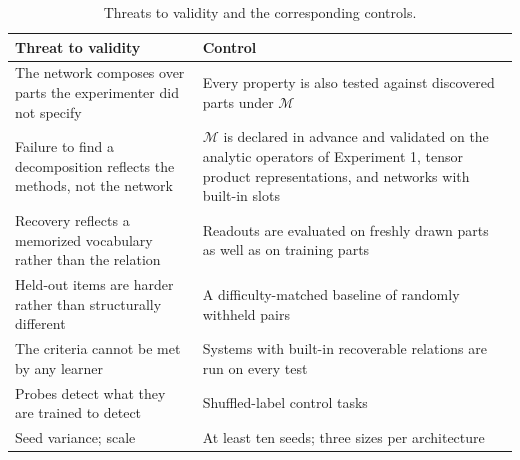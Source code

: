 \documentclass{article}
\theoremstyle{definition}
\theoremstyle{plain}
\theoremstyle{remark}
\begin{document}
\begin{table}[h]
  \caption{Threats to validity and the corresponding controls.}
  \label{tab:controls}
  \centering\small
  \begin{tabularx}{\linewidth}{@{}YY@{}}
    \toprule
    Threat to validity & Control \\
    \midrule
    The network composes over parts the experimenter did not specify & Every property is also tested against discovered parts under $\mathcal{M}$ \\
    Failure to find a decomposition reflects the methods, not the network & $\mathcal{M}$ is declared in advance and validated on the analytic operators of Experiment 1, tensor product representations, and networks with built-in slots \\
    Recovery reflects a memorized vocabulary rather than the relation & Readouts are evaluated on freshly drawn parts as well as on training parts \\
    Held-out items are harder rather than structurally different & A difficulty-matched baseline of randomly withheld pairs \\
    The criteria cannot be met by any learner & Systems with built-in recoverable relations are run on every test \\
    Probes detect what they are trained to detect & Shuffled-label control tasks \citep{hewitt2019} \\
    Seed variance; scale & At least ten seeds; three sizes per architecture \\
    \bottomrule
  \end{tabularx}
\end{table}
\end{document}
